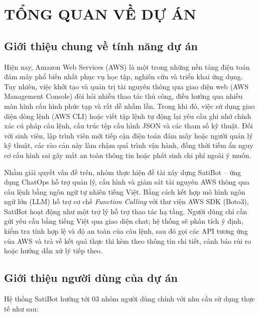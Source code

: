 \documentclass[a4paper,12pt]{article}
\begin{document}
\section{TỔNG QUAN VỀ DỰ ÁN}

\subsection{Giới thiệu chung về tính năng dự án}

Hiện nay, Amazon Web Services (AWS) là một trong những nền tảng điện toán đám mây phổ biến nhất phục vụ học tập, nghiên cứu và triển khai ứng dụng. Tuy nhiên, việc khởi tạo và quản trị tài nguyên thông qua giao diện web (AWS Management Console) đòi hỏi nhiều thao tác thủ công, điều hướng qua nhiều màn hình cấu hình phức tạp và rất dễ nhầm lẫn. Trong khi đó, việc sử dụng giao diện dòng lệnh (AWS CLI) hoặc viết tập lệnh tự động lại yêu cầu ghi nhớ chính xác cú pháp câu lệnh, cấu trúc tệp cấu hình JSON và các tham số kỹ thuật. Đối với sinh viên, lập trình viên mới tiếp cận điện toán đám mây hoặc người quản lý kỹ thuật, các rào cản này làm chậm quá trình vận hành, đồng thời tiềm ẩn nguy cơ cấu hình sai gây mất an toàn thông tin hoặc phát sinh chi phí ngoài ý muốn.

Nhằm giải quyết vấn đề trên, nhóm thực hiện đề tài xây dựng SatiBot -- ứng dụng ChatOps hỗ trợ quản lý, cấu hình và giám sát tài nguyên AWS thông qua câu lệnh bằng ngôn ngữ tự nhiên tiếng Việt. Bằng cách kết hợp mô hình ngôn ngữ lớn (LLM) hỗ trợ cơ chế \textit{Function Calling} với thư viện AWS SDK (Boto3), SatiBot hoạt động như một trợ lý hỗ trợ thao tác hạ tầng. Người dùng chỉ cần gửi yêu cầu bằng tiếng Việt qua giao diện chat; hệ thống sẽ phân tích ý định, kiểm tra tính hợp lệ và độ an toàn của câu lệnh, sau đó gọi các API tương ứng của AWS và trả về kết quả thực thi kèm theo thông tin chi tiết, cảnh báo rủi ro hoặc hướng dẫn xử lý tiếp theo.

\subsection{Giới thiệu người dùng của dự án}

Hệ thống SatiBot hướng tới 03 nhóm người dùng chính với nhu cầu sử dụng thực tế như sau:
\end{document}
